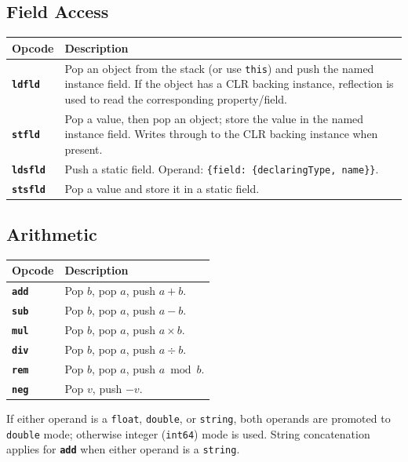 \documentclass[11pt,a4paper]{article}
\newcommand{\code}[1]{\texttt{\small #1}}
\newcommand{\opcode}[1]{\textbf{\texttt{#1}}}
\begin{document}
\subsection{Field Access}

\begin{longtable}{lp{10cm}}
  \toprule
  \textbf{Opcode} & \textbf{Description} \\
  \midrule
  \endhead
  \opcode{ldfld}  & Pop an object from the stack (or use \texttt{this}) and push the
                    named instance field. If the object has a CLR backing instance,
                    reflection is used to read the corresponding property/field. \\
  \opcode{stfld}  & Pop a value, then pop an object; store the value in the named
                    instance field. Writes through to the CLR backing instance when
                    present. \\
  \opcode{ldsfld} & Push a static field. Operand:
                    \code{\{field: \{declaringType, name\}\}}. \\
  \opcode{stsfld} & Pop a value and store it in a static field. \\
  \bottomrule
\end{longtable}

\subsection{Arithmetic}

\begin{longtable}{lp{10cm}}
  \toprule
  \textbf{Opcode} & \textbf{Description} \\
  \midrule
  \endhead
  \opcode{add} & Pop $b$, pop $a$, push $a + b$. \\
  \opcode{sub} & Pop $b$, pop $a$, push $a - b$. \\
  \opcode{mul} & Pop $b$, pop $a$, push $a \times b$. \\
  \opcode{div} & Pop $b$, pop $a$, push $a \div b$. \\
  \opcode{rem} & Pop $b$, pop $a$, push $a \bmod b$. \\
  \opcode{neg} & Pop $v$, push $-v$. \\
  \bottomrule
\end{longtable}

If either operand is a \texttt{float}, \texttt{double}, or \texttt{string},
both operands are promoted to \texttt{double} mode; otherwise integer
(\texttt{int64}) mode is used. String concatenation applies for
\opcode{add} when either operand is a \texttt{string}.
\end{document}
